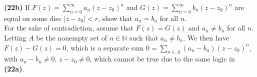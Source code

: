 \documentclass[12pt,letterpaper]{article}
\begin{document}
\textbf{(22b)} If \(F(z) = \sum_{n=0}^{\infty} a_{n}(z - z_{0})^{n}\) and \(G(z) = \sum_{n=0}^{\infty} b_{n}(z-z_{0})^{n}\) are equal on some disc \(|z - z_{0}|< r\), show that \(a_{n} = b_{n}\) for all \(n\). \\

For the sake of contradiction, assume that \(F(z) = G(z)\) and \(a_{n} \neq b_{n}\) for all \(n\). Letting \(A\) be the nonempty set of \(n \in \mathbb{N}\) such that \(a_{n} \neq b_{n}\). We then have \(F(z) - G(z) = 0\), which is a separate sum \(0 = \sum_{n \in A} (a_{n} - b_{n})(z-z_{0})^{n}\), with \(a_{n}-b_{n} \neq 0\), \(z - z_{0} \neq 0\), which cannot be true due to the same logic in \textbf{(22a)}. \\



\textbf{}
\end{document}
